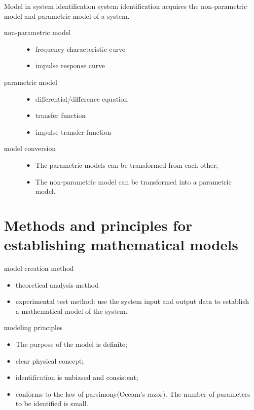 \begin{frame}{Model in system identification}
system identification acquires the non-parametric model and parametric model of a system.
\begin{description}
	\item[non-parametric model]
	\begin{itemize}
		\item frequency characteristic curve
		\item impulse response curve
	\end{itemize}
	\item[parametric model]
	\begin{itemize}
		\item differential/difference equation
		\item transfer function
		\item impulse transfer function
	\end{itemize}
	\item[model conversion]
	\begin{itemize}
	\item The parametric models can be transformed from each other;
	\item The non-parametric model can be transformed into a parametric model.
	\end{itemize}
\end{description}
\end{frame}

\section{Methods and principles for establishing mathematical models}
\begin{frame}{model creation method}
\begin{itemize}
	\item theoretical analysis method
	\item experimental test method: use the system input and output data to establish a mathematical model of the system.
\end{itemize}
\end{frame}

\begin{frame}{modeling principles}
\begin{itemize}
	\item The purpose of the model is definite;
	\item clear physical concept;
	\item identification is unbiased and consistent;
	\item conforms to the law of parsimony(Occam's razor). The number of parameters to be identified is small.
\end{itemize}
\end{frame}


